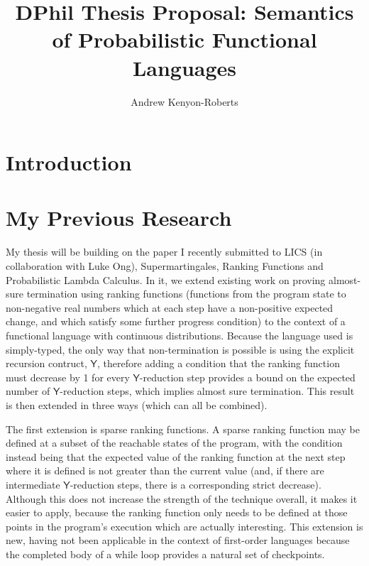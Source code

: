 \documentclass[titlepage]{article}
\title{DPhil Thesis Proposal: Semantics of Probabilistic Functional Languages}
\author{Andrew Kenyon-Roberts}
\newcommand{\tY}{\mathsf{Y}}
\begin{document}
\maketitle
\section{Introduction}



\section{My Previous Research}
My thesis will be building on the paper I recently submitted to LICS (in collaboration with Luke Ong), Supermartingales, Ranking Functions and Probabilistic Lambda Calculus. In it, we extend existing work on proving almost-sure termination using ranking functions (functions from the program state to non-negative real numbers which at each step have a non-positive expected change, and which satisfy some further progress condition) to the context of a functional language with continuous distributions. Because the language used is simply-typed, the only way that non-termination is possible is using the explicit recursion contruct, $\tY$, therefore adding a condition that the ranking function must decrease by 1 for every $\tY$-reduction step provides a bound on the expected number of $\tY$-reduction steps, which implies almost sure termination. This result is then extended in three ways (which can all be combined).

The first extension is sparse ranking functions. A sparse ranking function may be defined at a subset of the reachable states of the program, with the condition instead being that the expected value of the ranking function at the next step where it is defined is not greater than the current value (and, if there are intermediate $\tY$-reduction steps, there is a corresponding strict decrease). Although this does not increase the strength of the technique overall, it makes it easier to apply, because the ranking function only needs to be defined at those points in the program's execution which are actually interesting. This extension is new, having not been applicable in the context of first-order languages because the completed body of a while loop provides a natural set of checkpoints.
\end{document}
